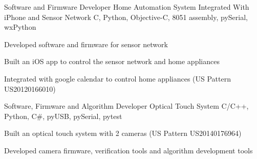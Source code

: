 

\begin{cventries}

  \cventry
    {Software and Firmware Developer} %
    {Home Automation System Integrated With iPhone and Sensor Network} %
    {C, Python, Objective-C, 8051 assembly, pySerial, wxPython} %
    {} %
    {
      \begin{cvitems} %
        \item {Developed software and firmware for sensor network}
        \item {Built an iOS app to control the sensor network and home appliances}
        \item {Integrated with google calendar to control home appliances (US Pattern US20120166010)}
      \end{cvitems}
    }

\cventry
    {Software, Firmware and Algorithm Developer} %
    {Optical Touch System} %
    {C/C++, Python, C{\#}, pyUSB, pySerial, pytest} %
    {} %
    {
      \begin{cvitems} %
        \item {Built an optical touch system with 2 cameras (US Pattern US20140176964)}
        \item {Developed camera firmware, verification tools and algorithm development tools}
      \end{cvitems}
    }

\end{cventries}
